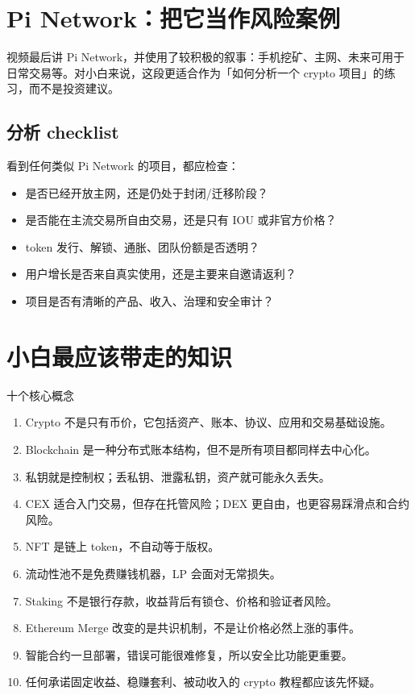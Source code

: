 \documentclass[UTF8,11pt]{ctexart}
\begin{document}
\section{Pi Network：把它当作风险案例}

视频最后讲 Pi Network，并使用了较积极的叙事：手机挖矿、主网、未来可用于日常交易等。对小白来说，这段更适合作为「如何分析一个 crypto 项目」的练习，而不是投资建议。

\subsection{分析 checklist}

看到任何类似 Pi Network 的项目，都应检查：
\begin{itemize}
  \item 是否已经开放主网，还是仍处于封闭/迁移阶段？
  \item 是否能在主流交易所自由交易，还是只有 IOU 或非官方价格？
  \item token 发行、解锁、通胀、团队份额是否透明？
  \item 用户增长是否来自真实使用，还是主要来自邀请返利？
  \item 项目是否有清晰的产品、收入、治理和安全审计？
\end{itemize}

\section{小白最应该带走的知识}

\begin{keybox}{十个核心概念}
\begin{enumerate}
  \item Crypto 不是只有币价，它包括资产、账本、协议、应用和交易基础设施。
  \item Blockchain 是一种分布式账本结构，但不是所有项目都同样去中心化。
  \item 私钥就是控制权；丢私钥、泄露私钥，资产就可能永久丢失。
  \item CEX 适合入门交易，但存在托管风险；DEX 更自由，也更容易踩滑点和合约风险。
  \item NFT 是链上 token，不自动等于版权。
  \item 流动性池不是免费赚钱机器，LP 会面对无常损失。
  \item Staking 不是银行存款，收益背后有锁仓、价格和验证者风险。
  \item Ethereum Merge 改变的是共识机制，不是让价格必然上涨的事件。
  \item 智能合约一旦部署，错误可能很难修复，所以安全比功能更重要。
  \item 任何承诺固定收益、稳赚套利、被动收入的 crypto 教程都应该先怀疑。
\end{enumerate}
\end{keybox}
\end{document}
